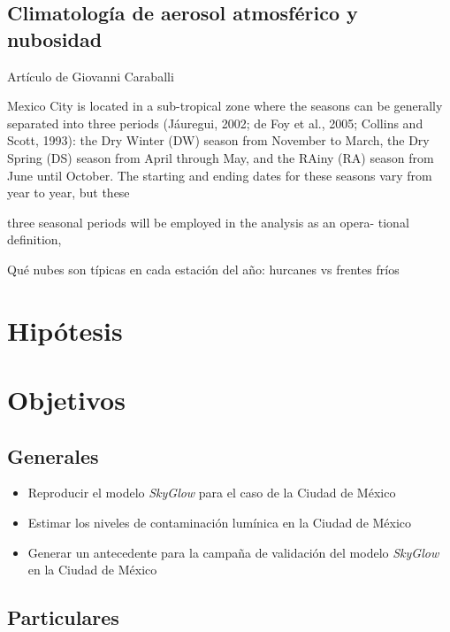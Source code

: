 \subsection{Climatología de aerosol atmosférico y nubosidad}

Artículo de Giovanni Caraballi

Mexico City is located in a sub-tropical zone where the seasons can
be generally separated into three periods (Jáuregui, 2002; de Foy et al.,
2005; Collins and Scott, 1993): the Dry Winter (DW) season from
November to March, the Dry Spring (DS) season from April through
May, and the RAiny (RA) season from June until October. The starting
and ending dates for these seasons vary from year to year, but these

three seasonal periods will be employed in the analysis as an opera-
tional definition,

Qué nubes son típicas en cada estación del año: hurcanes vs frentes fríos

\section{Hipótesis}

\section{Objetivos}

\subsection{Generales}

\begin{itemize}

    \item Reproducir el modelo \textit{SkyGlow} para el caso de la Ciudad de México
    
    \item Estimar los niveles de contaminación lumínica en la Ciudad de México 
    
    \item Generar un antecedente para la campaña de validación del modelo \textit{SkyGlow} en la Ciudad de México
    
\end{itemize}

\subsection{Particulares}

